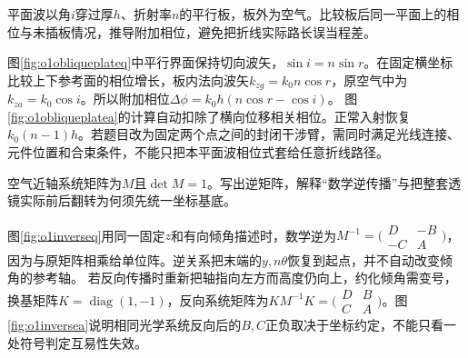 \begin{exercise}\label{ex:o1obliqueplate}
平面波以角$i$穿过厚$h$、折射率$n$的平行板，板外为空气。比较板后同一平面上的相位与未插板情况，推导附加相位，避免把折线实际路长误当程差。
\end{exercise}
\begin{solution}
图\ref{fig:o1obliqueplateq}中平行界面保持切向波矢，$\sin i=n\sin r$。在固定横坐标比较上下参考面的相位增长，板内法向波矢$k_{zg}=k_0n\cos r$，原空气中为$k_{za}=k_0\cos i$。所以附加相位$\Delta\phi=k_0h(n\cos r-\cos i)$。
图\ref{fig:o1obliqueplatea}的计算自动扣除了横向位移相关相位。正常入射恢复$k_0(n-1)h$。若题目改为固定两个点之间的封闭干涉臂，需同时满足光线连接、元件位置和合束条件，不能只把本平面波相位式套给任意折线路径。
\end{solution}

\begin{exercise}\label{ex:o1matrixinverse}
空气近轴系统矩阵为$M$且$\det M=1$。写出逆矩阵，解释“数学逆传播”与把整套透镜实际前后翻转为何须先统一坐标基底。
\end{exercise}
\begin{solution}
图\ref{fig:o1inverseq}用同一固定$z$和有向倾角描述时，数学逆为$M^{-1}=\bigl(\begin{smallmatrix}D&-B\\-C&A\end{smallmatrix}\bigr)$，因为与原矩阵相乘给单位阵。逆关系把末端的$y,n\theta$恢复到起点，并不自动改变倾角的参考轴。
若反向传播时重新把轴指向左方而高度仍向上，约化倾角需变号，换基矩阵$K=\operatorname{diag}(1,-1)$，反向系统矩阵为$KM^{-1}K=\bigl(\begin{smallmatrix}D&B\\C&A\end{smallmatrix}\bigr)$。图\ref{fig:o1inversea}说明相同光学系统反向后的$B,C$正负取决于坐标约定，不能只看一处符号判定互易性失效。
\end{solution}

